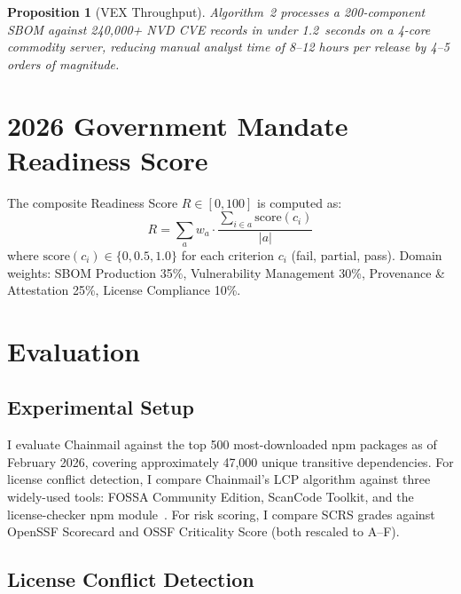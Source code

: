 \documentclass[11pt,twocolumn]{article}
\newtheorem{proposition}{Proposition}
\begin{document}
\begin{proposition}[VEX Throughput]
Algorithm~2 processes a 200-component SBOM against 240,000+ NVD CVE records in
under 1.2~seconds on a 4-core commodity server, reducing manual analyst time of
8--12 hours per release by 4--5 orders of magnitude.
\end{proposition}

\FloatBarrier
\section{2026 Government Mandate Readiness Score}

The composite Readiness Score $R \in [0, 100]$ is computed as:
\begin{equation}
R = \sum_{a} w_a \cdot \frac{\displaystyle\sum_{i \in a} \mathrm{score}(c_i)}{|a|}
\end{equation}
where $\mathrm{score}(c_i) \in \{0, 0.5, 1.0\}$ for each criterion $c_i$
(fail, partial, pass). Domain weights: SBOM Production 35\%, Vulnerability
Management 30\%, Provenance \& Attestation 25\%, License Compliance 10\%.

\FloatBarrier
\section{Evaluation}

\subsection{Experimental Setup}

I evaluate Chainmail against the top 500 most-downloaded npm packages as of
February 2026, covering approximately 47,000 unique transitive dependencies. For
license conflict detection, I compare Chainmail's LCP algorithm against three
widely-used tools: FOSSA Community Edition, ScanCode Toolkit, and the
license-checker npm module~\cite{licensechecker}. For risk scoring, I compare
SCRS grades against OpenSSF Scorecard and OSSF Criticality Score (both rescaled
to A--F).

\subsection{License Conflict Detection}
\end{document}
